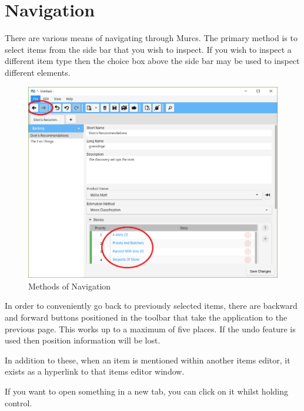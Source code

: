 \section{Navigation}

There are various means of navigating through Murcs. The primary method is to select items from the side bar that you wish to inspect. If you wish to inspect a different item type then the choice box above the side bar may be used to inspect different elements.

\begin{figure}[H]
\centering
\includegraphics[width=\textwidth]{images/screenshots/navigation.PNG}
\caption{Methods of Navigation}
\label{fig:new_project}
\end{figure}

In order to conveniently go back to previously selected items, there are backward and forward buttons positioned in the toolbar that take the application to the previous page. This works up to a maximum of five places. If the undo feature is used then position information will be lost.

In addition to these, when an item is mentioned within another items editor, it exists as a hyperlink to that items editor window.

If you want to open something in a new tab, you can click on it whilst holding control.